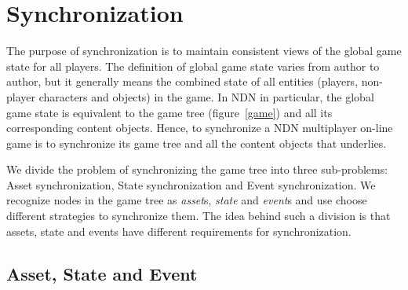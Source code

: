 \documentclass{sigchi}
\begin{document}
\section{Synchronization}
\label{sync}

The purpose of synchronization is to maintain consistent views of the global game state for all players. The definition of global game state varies from author to author, but it generally means the combined state of all entities (players, non-player characters and objects) in the game. In NDN in particular, the global game state is equivalent to the game tree (figure~\ref{game}) and all its corresponding content objects. Hence, to synchronize a NDN multiplayer on-line game is to synchronize its game tree and all the content objects that underlies.

We divide the problem of synchronizing the game tree into three sub-problems: Asset synchronization, State synchronization and Event synchronization. We recognize nodes in the game tree as \emph{asset}s, \emph{state} and \emph{event}s and use choose different strategies to synchronize them. The idea behind such a division is that assets, state and events have different requirements for synchronization.

\subsection{Asset, State and Event}
\label{ase}
\end{document}
